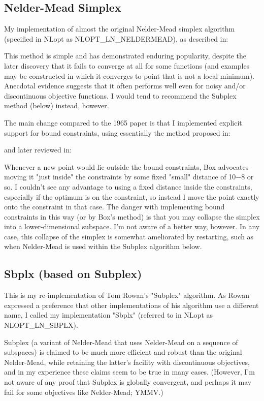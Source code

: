 \subsection{Nelder-Mead Simplex}
My implementation of almost the original Nelder-Mead simplex algorithm (specified in NLopt as NLOPT\_LN\_NELDERMEAD), as described in: \cite{Nelder_1965}


This method is simple and has demonstrated enduring popularity, despite the later discovery that it fails to converge at all for some functions (and examples may be constructed in which it converges to point that is not a local minimum). Anecdotal evidence suggests that it often performs well even for noisy and/or discontinuous objective functions. I would tend to recommend the Subplex method (below) instead, however. 

The main change compared to the 1965 paper is that I implemented explicit support for bound constraints, using essentially the method proposed in: \cite{Box_1965} 


and later reviewed in: \cite{Richardson_1973}


Whenever a new point would lie outside the bound constraints, Box advocates moving it "just inside" the constraints by some fixed "small" distance of 10−8 or so. I couldn't see any advantage to using a fixed distance inside the constraints, especially if the optimum is on the constraint, so instead I move the point exactly onto the constraint in that case. The danger with implementing bound constraints in this way (or by Box's method) is that you may collapse the simplex into a lower-dimensional subspace. I'm not aware of a better way, however. In any case, this collapse of the simplex is somewhat ameliorated by restarting, such as when Nelder-Mead is used within the Subplex algorithm below. 





\subsection{Sbplx (based on Subplex)}
This is my re-implementation of Tom Rowan's "Subplex" algorithm. As Rowan expressed a preference that other implementations of his algorithm use a different name, I called my implementation "Sbplx" (referred to in NLopt as NLOPT\_LN\_SBPLX). 

Subplex (a variant of Nelder-Mead that uses Nelder-Mead on a sequence of subspaces) is claimed to be much more efficient and robust than the original Nelder-Mead, while retaining the latter's facility with discontinuous objectives, and in my experience these claims seem to be true in many cases. (However, I'm not aware of any proof that Subplex is globally convergent, and perhaps it may fail for some objectives like Nelder-Mead; YMMV.) 

